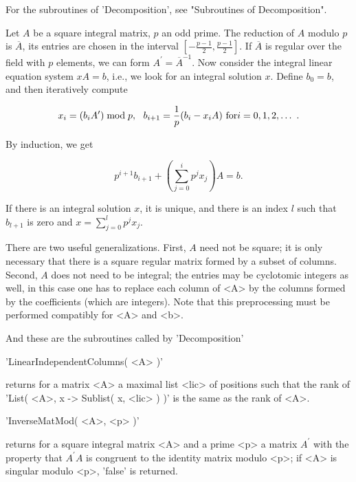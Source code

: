 For   the  subroutines     of  'Decomposition',   see  "Subroutines    of
Decomposition".


Let $A$ be a square integral matrix, $p$ an  odd prime.  The reduction of
$A$ modulo $p$ is $\overline{A}$, its entries are  chosen in the interval
$[-\frac{p-1}{2}, \frac{p-1}{2}]$.  If $\overline{A}$ is regular over the
field with $p$ elements, we  can  form $A^{\prime} =  \overline{A}^{-1}$.
Now consider the integral linear equation system $x A = b$, i.e., we look
for an  integral solution $x$.  Define  $b_0  = b$, and  then iteratively
compute

\[ x_i = (b_i A^{\prime}) \bmod p,\ \ b_{i+1} = \frac{1}{p} (b_i - x_i A)
   \mbox{\rm\ for} i = 0, 1, 2, \ldots \ . \]

By induction, we get

\[ p^{i+1} b_{i+1} + ( \sum_{j=0}^{i} p^j x_j ) A = b . \]

If there is an integral solution $x$, it is unique, and there is an index
$l$ such that $b_{l+1}$ is zero and $x = \sum_{j=0}^{l} p^j x_j$.

There are two useful generalizations.  First,  $A$ need not be square; it
is only necessary  that  there is a square   regular matrix formed   by a
subset of columns.  Second, $A$ does not need to be integral; the entries
may be cyclotomic integers as well, in this case one  has to replace each
column  of  <A>  by the columns  formed  by  the coefficients  (which are
integers).  Note that this preprocessing must be performed compatibly for
<A> and <b>.

And these are the subroutines called by 'Decomposition'\:

\vspace{5mm}
'LinearIndependentColumns( <A> )'%

returns for a matrix <A> a maximal list <lic>  of positions such that the
rank of 'List( <A>, x -> Sublist( x,  <lic> ) )'  is the same as the rank
of <A>.

\vspace{5mm}
'InverseMatMod( <A>, <p> )'%

returns for a   square  integral matrix  <A>   and a prime  <p> a  matrix
$A^{\prime}$ with the  property that $A^{\prime}  A$ is  congruent to the
identity matrix modulo <p>;  if <A> is  singular  modulo <p>,  'false' is
returned.


